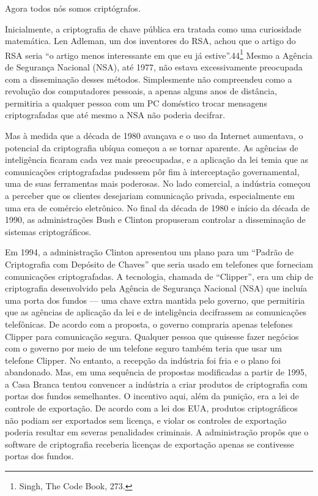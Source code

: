 \documentclass{book}
\begin{document}
Agora todos nós somos criptógrafos.

Inicialmente, a criptografia de chave pública era tratada como uma curiosidade matemática. Len Adleman, um dos inventores do RSA, achou que o artigo do RSA seria ``o artigo menos interessante em que eu já estive''.44\footnote{Singh, The Code Book, 273.} Mesmo a Agência de Segurança Nacional (NSA), até 1977, não estava excessivamente preocupada com a disseminação desses métodos. Simplesmente não compreendeu como a revolução dos computadores pessoais, a apenas alguns anos de distância, permitiria a qualquer pessoa com um PC doméstico trocar mensagens criptografadas que até mesmo a NSA não poderia decifrar.

Mas à medida que a década de 1980 avançava e o uso da Internet aumentava, o potencial da criptografia ubíqua começou a se tornar aparente. As agências de inteligência ficaram cada vez mais preocupadas, e a aplicação da lei temia que as comunicações criptografadas pudessem pôr fim à interceptação governamental, uma de suas ferramentas mais poderosas. No lado comercial, a indústria começou a perceber que os clientes desejariam comunicação privada, especialmente em uma era de comércio eletrônico. No final da década de 1980 e início da década de 1990, as administrações Bush e Clinton propuseram controlar a disseminação de sistemas criptográficos.

Em 1994, a administração Clinton apresentou um plano para um ``Padrão de Criptografia com Depósito de Chaves'' que seria usado em telefones que forneciam comunicações criptografadas. A tecnologia, chamada de ``Clipper'', era um chip de criptografia desenvolvido pela Agência de Segurança Nacional (NSA) que incluía uma porta dos fundos --- uma chave extra mantida pelo governo, que permitiria que as agências de aplicação da lei e de inteligência decifrassem as comunicações telefônicas. De acordo com a proposta, o governo compraria apenas telefones Clipper para comunicação segura. Qualquer pessoa que quisesse fazer negócios com o governo por meio de um telefone seguro também teria que usar um telefone Clipper. No entanto, a recepção da indústria foi fria e o plano foi abandonado. Mas, em uma sequência de propostas modificadas a partir de 1995, a Casa Branca tentou convencer a indústria a criar produtos de criptografia com portas dos fundos semelhantes. O incentivo aqui, além da punição, era a lei de controle de exportação. De acordo com a lei dos EUA, produtos criptográficos não podiam ser exportados sem licença, e violar os controles de exportação poderia resultar em severas penalidades criminais. A administração propôs que o software de criptografia receberia licenças de exportação apenas se contivesse portas dos fundos.
\end{document}
